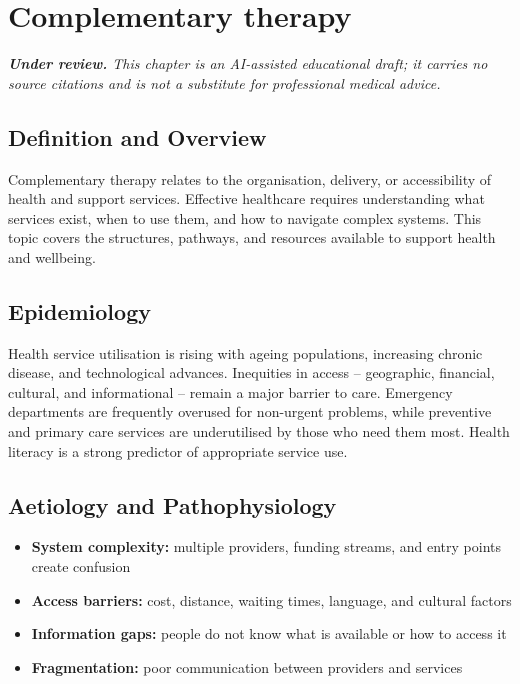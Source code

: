 \chapter{Complementary therapy}

\medskip
\noindent\textit{\textbf{Under review.} This chapter is an AI-assisted educational draft; it carries no source citations and is not a substitute for professional medical advice.}

\section*{Definition and Overview}
Complementary therapy relates to the organisation, delivery, or accessibility of health and support services. Effective healthcare requires understanding what services exist, when to use them, and how to navigate complex systems. This topic covers the structures, pathways, and resources available to support health and wellbeing.

\section*{Epidemiology}
Health service utilisation is rising with ageing populations, increasing chronic disease, and technological advances. Inequities in access -- geographic, financial, cultural, and informational -- remain a major barrier to care. Emergency departments are frequently overused for non-urgent problems, while preventive and primary care services are underutilised by those who need them most. Health literacy is a strong predictor of appropriate service use.

\section*{Aetiology and Pathophysiology}
\begin{itemize}
    \item \textbf{System complexity:} multiple providers, funding streams, and entry points create confusion
    \item \textbf{Access barriers:} cost, distance, waiting times, language, and cultural factors
    \item \textbf{Information gaps:} people do not know what is available or how to access it
    \item \textbf{Fragmentation:} poor communication between providers and services
\end{itemize}


